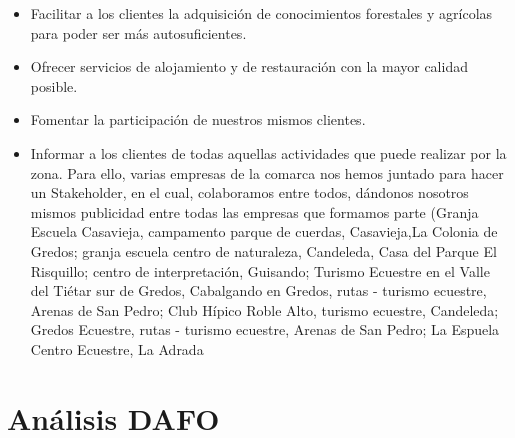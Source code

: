 \begin{itemize}
\item Facilitar a los clientes la adquisición de conocimientos forestales y agrícolas para poder ser más autosuficientes.
\item Ofrecer servicios de alojamiento y de restauración con la mayor calidad posible.
\item Fomentar la participación de nuestros mismos clientes.
\item Informar a los clientes de todas aquellas actividades que puede realizar por la zona. Para ello, varias empresas de la comarca nos hemos juntado para hacer un Stakeholder, en el cual, colaboramos entre todos, dándonos nosotros  mismos publicidad entre todas las empresas que formamos parte (Granja Escuela Casavieja, campamento parque de cuerdas, Casavieja,La Colonia de Gredos; granja escuela centro de naturaleza, Candeleda, Casa del Parque El Risquillo; centro de interpretación, Guisando; Turismo Ecuestre en el Valle del Tiétar sur de Gredos, Cabalgando en Gredos, rutas - turismo ecuestre, Arenas de San Pedro; Club Hípico Roble Alto, turismo ecuestre, Candeleda; Gredos Ecuestre, rutas - turismo ecuestre, Arenas de San Pedro; La Espuela Centro Ecuestre, La Adrada
\end{itemize}


\newpage
\section{Análisis DAFO}
\label{sec:dafo}

